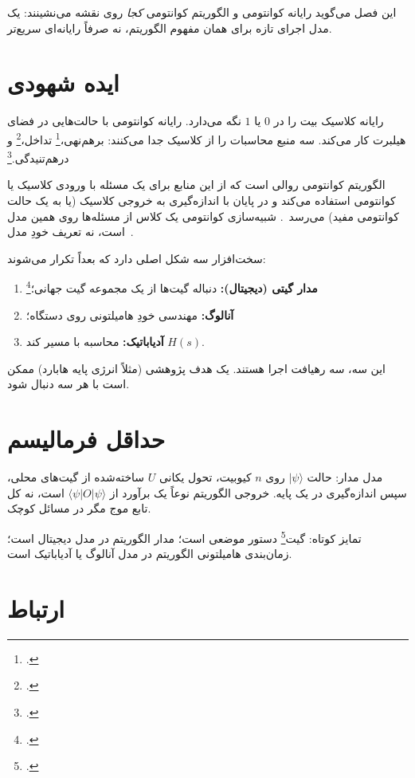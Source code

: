 این فصل می‌گوید رایانه کوانتومی و الگوریتم کوانتومی \emph{کجا} روی نقشه می‌نشینند: یک مدل اجرای تازه برای همان مفهوم الگوریتم، نه صرفاً رایانه‌ای سریع‌تر.

\section{ایده شهودی}

رایانه کلاسیک بیت را در $0$ یا $1$ نگه می‌دارد. رایانه کوانتومی با حالت‌هایی در فضای هیلبرت کار می‌کند. سه منبع محاسبات را از کلاسیک جدا می‌کنند: برهم‌نهی،\footnote{.} تداخل،\footnote{.} و درهم‌تنیدگی.\footnote{.}

الگوریتم کوانتومی روالی است که از این منابع برای یک مسئله با ورودی کلاسیک یا کوانتومی استفاده می‌کند و در پایان با اندازه‌گیری به خروجی کلاسیک (یا به یک حالت کوانتومی مفید) می‌رسد~\cite{NielsenChuang2010}. شبیه‌سازی کوانتومی یک کلاس از مسئله‌ها روی همین مدل است، نه تعریف خودِ مدل~\cite{Feynman1982,Lloyd1996,Georgescu2014}.

سخت‌افزار سه شکل اصلی دارد که بعداً تکرار می‌شوند:
\begin{enumerate}
	\item \textbf{مدار گیتی (دیجیتال):} دنباله گیت‌ها از یک مجموعه گیت جهانی؛\footnote{.}
	\item \textbf{آنالوگ:} مهندسی خودِ هامیلتونی روی دستگاه؛
	\item \textbf{آدیاباتیک:} محاسبه با مسیر کند $H(s)$.
\end{enumerate}
این سه، سه رهیافت اجرا هستند. یک هدف پژوهشی (مثلاً انرژی پایه هابارد) ممکن است با هر سه دنبال شود.

\section{حداقل فرمالیسم}

مدل مدار: حالت $\lvert\psi\rangle$ روی $n$ کیوبیت، تحول یکانی $U$ ساخته‌شده از گیت‌های محلی، سپس اندازه‌گیری در یک پایه. خروجی الگوریتم نوعاً یک برآورد از $\langle\psi\rvert O\lvert\psi\rangle$ است، نه کل تابع موج مگر در مسائل کوچک.

تمایز کوتاه: گیت\footnote{.} دستور موضعی است؛ مدار الگوریتم در مدل دیجیتال است؛ زمان‌بندی هامیلتونی الگوریتم در مدل آنالوگ یا آدیاباتیک است.

\section{ارتباط}

